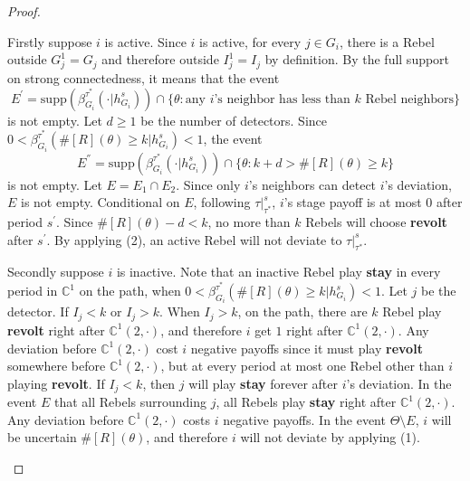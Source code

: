 \documentclass[12pt,letter]{article}
\newcommand{\Kappa}{\mathbb{C}}
\theoremstyle{definition}
\theoremstyle{definition}
\theoremstyle{remark}
\theoremstyle{claim}
\begin{document}
\begin{proof}
\begin{enumerate}[label=(\arabic*)]
Firstly suppose $i$ is active. Since $i$ is active, for every $j\in G_i$, there is a Rebel outside $G^1_j=G_j$ and therefore outside $I^1_j=I_j$ by definition. By the full support on strong connectedness, it means that the event
\[E^{'}=\mathrm{supp}(\beta^{\tau^{*}}_{G_i}(\cdot |h^s_{G_i}))\cap \{\theta:\text{any $i$'s neighbor has less than $k$ Rebel neighbors}\}\]
is not empty. Let $d\geq 1$ be the number of detectors. Since $0<\beta^{\tau^{*}}_{G_i}(\#[R](\theta)\geq k|h^s_{G_i})<1$, the event
\[E^{''}=\mathrm{supp}(\beta^{\tau^{*}}_{G_i}(\cdot |h^s_{G_i}))\cap \{\theta:k+d>\#[R](\theta)\geq k\}\] 
is not empty. Let $E=E_1\cap E_2$. Since only $i$'s neighbors can detect $i$'s deviation, $E$ is not empty. Conditional on $E$, following $\tau|^s_{\tau^{*}}$, $i$'s stage payoff is at most 0 after period $s^{'}$. Since $\#[R](\theta)-d<k$, no more than $k$ Rebels will choose \textbf{revolt} after $s^{'}$. By applying (2), an active Rebel will not deviate to $\tau|^s_{\tau^{*}}$.

Secondly suppose $i$ is inactive. Note that an inactive Rebel play \textbf{stay} in every period in $\Kappa^1$ on the path, when $0<\beta^{\tau^{*}}_{G_i}(\#[R](\theta)\geq k|h^s_{G_i})<1$. Let $j$ be the detector. If $I_j<k$ or $I_j>k$. When $I_j>k$, on the path, there are $k$ Rebel play \textbf{revolt} right after $\Kappa^1(2,\cdot)$, and therefore $i$ get $1$ right after $\Kappa^1(2,\cdot)$. Any deviation before $\Kappa^1(2,\cdot)$ cost $i$ negative payoffs since it must play \textbf{revolt} somewhere before $\Kappa^1(2,\cdot)$, but at every period at most one Rebel other than $i$ playing \textbf{revolt}. If $I_j<k$, then $j$ will play \textbf{stay} forever after $i$'s deviation. In the event $E$ that all Rebels surrounding $j$, all Rebels play \textbf{stay} right after $\Kappa^1(2,\cdot)$. Any deviation before $\Kappa^1(2,\cdot)$ costs $i$ negative payoffs. In the event $\Theta\setminus E$, $i$ will be uncertain $\#[R](\theta)$, and therefore $i$ will not deviate by applying (1).
\end{enumerate}
\end{proof}
\end{document}
